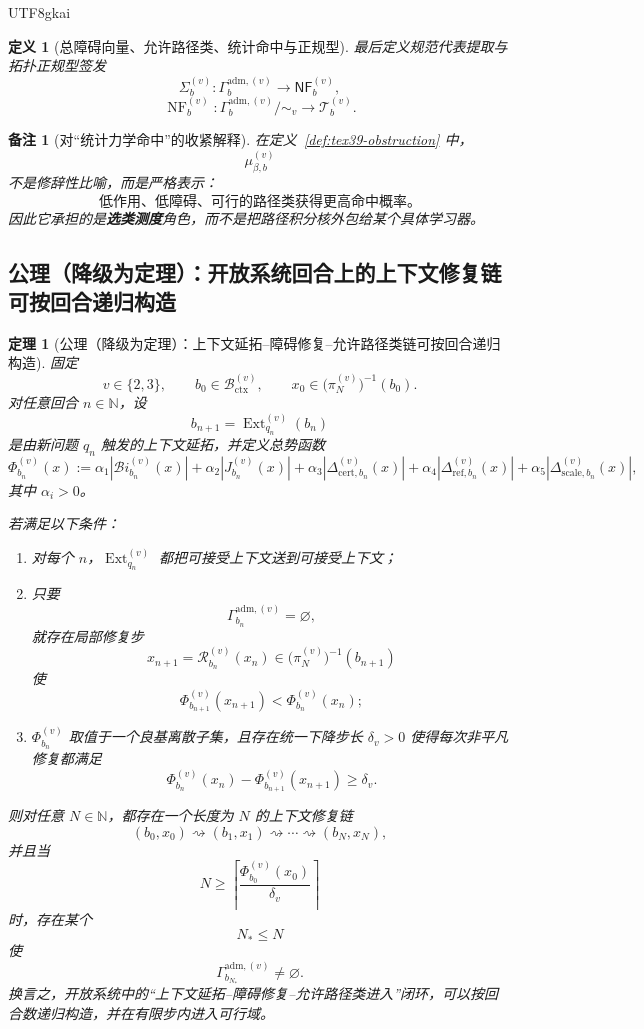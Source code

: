 \documentclass[12pt]{article}
\newtheorem{definition}{定义}[section]
\newtheorem{theorem}{定理}[section]
\newtheorem{remark}{备注}[section]
\newcommand{\NN}{\mathbb{N}}
\newcommand{\Ext}{\operatorname{Ext}}
\newcommand{\NF}{\operatorname{NF}}
\newcommand{\Bi}{\mathcal{B}\!i}
\begin{document}
\begin{CJK*}{UTF8}{gkai}
\begin{definition}[总障碍向量、允许路径类、统计命中与正规型]
最后定义规范代表提取与拓扑正规型签发
\[
  \Sigma_b^{(v)}:
  \Gamma_b^{\mathrm{adm},(v)}
  \to
  \mathsf{NF}_b^{(v)},
\]
\[
  \NF_b^{(v)}:
  \Gamma_b^{\mathrm{adm},(v)}/\!\sim_v
  \to
  \mathcal T_b^{(v)}.
\]
\end{definition}

\begin{remark}[对“统计力学命中”的收紧解释]
在定义~\ref{def:tex39-obstruction} 中，
\[
  \mu_{\beta,b}^{(v)}
\]
不是修辞性比喻，而是严格表示：
\[
  \text{低作用、低障碍、可行的路径类获得更高命中概率。}
\]
因此它承担的是\textbf{选类测度}角色，而不是把路径积分核外包给某个具体学习器。
\end{remark}

\subsection{公理（降级为定理）：开放系统回合上的上下文修复链可按回合递归构造}
\label{subsec:tex39-ch1-axiom}

\begin{theorem}[公理（降级为定理）：上下文延拓--障碍修复--允许路径类链可按回合递归构造]
\label{thm:tex39-axiom}
固定
\[
  v\in\{2,3\},
  \qquad
  b_0\in \mathcal B_{\mathrm{ctx}}^{(v)},
  \qquad
  x_0\in \bigl(\pi_N^{(v)}\bigr)^{-1}(b_0).
\]
对任意回合 $n\in\NN$，设
\[
  b_{n+1}=\Ext_{q_n}^{(v)}(b_n)
\]
是由新问题 $q_n$ 触发的上下文延拓，并定义总势函数
\[
  \Phi_{b_n}^{(v)}(x)
  :=
  \alpha_1|\Bi_{b_n}^{(v)}(x)|
  +
  \alpha_2|J_{b_n}^{(v)}(x)|
  +
  \alpha_3|\Delta_{\mathrm{cert},b_n}^{(v)}(x)|
  +
  \alpha_4|\Delta_{\mathrm{ref},b_n}^{(v)}(x)|
  +
  \alpha_5|\Delta_{\mathrm{scale},b_n}^{(v)}(x)|,
\]
其中 $\alpha_i>0$。

若满足以下条件：
\begin{enumerate}
  \item 对每个 $n$，$\Ext_{q_n}^{(v)}$ 都把可接受上下文送到可接受上下文；
  \item 只要
  \[
    \Gamma_{b_n}^{\mathrm{adm},(v)}=\varnothing,
  \]
  就存在局部修复步
  \[
    x_{n+1}=\mathcal R_{b_n}^{(v)}(x_n)
    \in
    \bigl(\pi_N^{(v)}\bigr)^{-1}(b_{n+1})
  \]
  使
  \[
    \Phi_{b_{n+1}}^{(v)}(x_{n+1})
    <
    \Phi_{b_n}^{(v)}(x_n);
  \]
  \item $\Phi_{b_n}^{(v)}$ 取值于一个良基离散子集，且存在统一下降步长 $\delta_v>0$ 使得每次非平凡修复都满足
  \[
    \Phi_{b_n}^{(v)}(x_n)-\Phi_{b_{n+1}}^{(v)}(x_{n+1})\ge \delta_v.
  \]
\end{enumerate}
则对任意 $N\in\NN$，都存在一个长度为 $N$ 的上下文修复链
\[
  (b_0,x_0)
  \rightsquigarrow
  (b_1,x_1)
  \rightsquigarrow
  \cdots
  \rightsquigarrow
  (b_N,x_N),
\]
并且当
\[
  N\ge
  \left\lceil
    \frac{\Phi_{b_0}^{(v)}(x_0)}{\delta_v}
  \right\rceil
\]
时，存在某个
\[
  N_\ast\le N
\]
使
\[
  \Gamma_{b_{N_\ast}}^{\mathrm{adm},(v)}\neq\varnothing.
\]
换言之，开放系统中的“上下文延拓--障碍修复--允许路径类进入”闭环，可以按回合数递归构造，并在有限步内进入可行域。
\end{theorem}


\end{CJK*}
\end{document}
